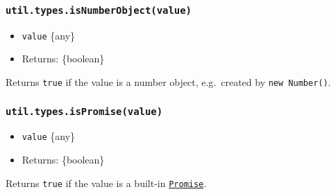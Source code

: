 \subsubsection{\texorpdfstring{\texttt{util.types.isNumberObject(value)}}{util.types.isNumberObject(value)}}\label{util.types.isnumberobjectvalue}

\begin{itemize}
\tightlist
\item
  \texttt{value} \{any\}
\item
  Returns: \{boolean\}
\end{itemize}

Returns \texttt{true} if the value is a number object, e.g.~created by
\texttt{new\ Number()}.

\begin{Shaded}
\begin{Highlighting}[]
\NormalTok{(}\NormalTok{)}\OperatorTok{;}  
\NormalTok{(} \NormalTok{(}\NormalTok{))}\OperatorTok{;}   
\end{Highlighting}
\end{Shaded}

\subsubsection{\texorpdfstring{\texttt{util.types.isPromise(value)}}{util.types.isPromise(value)}}\label{util.types.ispromisevalue}

\begin{itemize}
\tightlist
\item
  \texttt{value} \{any\}
\item
  Returns: \{boolean\}
\end{itemize}

Returns \texttt{true} if the value is a built-in
\href{https://developer.mozilla.org/en-US/docs/Web/JavaScript/Reference/Global_Objects/Promise}{\texttt{Promise}}.

\begin{Shaded}
\begin{Highlighting}[]
\NormalTok{(}\NormalTok{(}\NormalTok{))}\OperatorTok{;}  
\end{Highlighting}
\end{Shaded}

